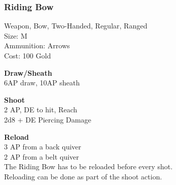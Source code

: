\subsubsection{Riding Bow}\label{weapon:ridingBow}
Weapon, Bow, Two-Handed, Regular, Ranged\\
Size: M\\
Ammunition: Arrows\\
Cost: 100 Gold

\textbf{Draw/Sheath}\\
6AP draw, 10AP sheath

\textbf{Shoot}\\
2 AP, DE to hit,  Reach\\
2d8 + \texttimes DE Piercing Damage

\textbf{Reload}\\
3 AP from a back quiver\\
2 AP from a belt quiver\\
The Riding Bow has to be reloaded before every shot.\\
Reloading can be done as part of the shoot action.


